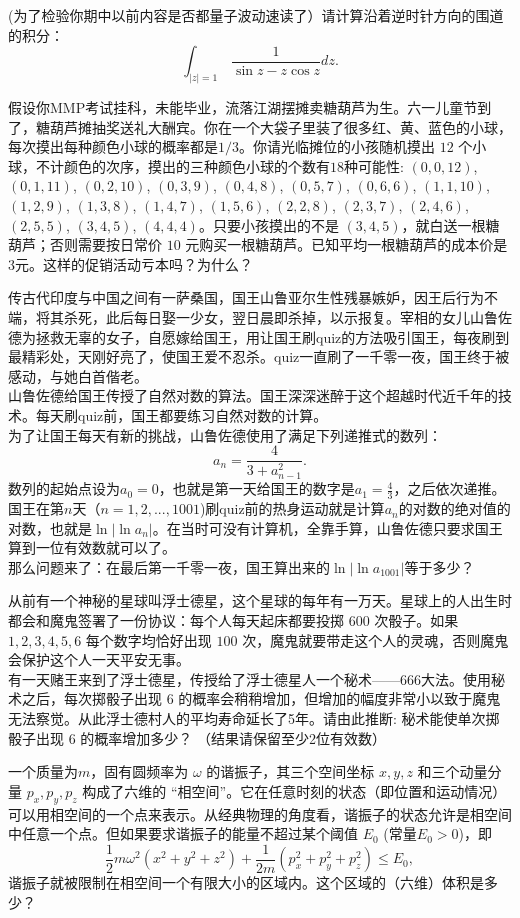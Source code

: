 \item[(1)]{(为了检验你期中以前内容是否都量子波动速读了）请计算沿着逆时针方向的围道的积分：
    $$\int_{|z|=1}\, \frac{1}{\sin z - z\cos z} dz.$$ }
\item[(2)]{假设你MMP考试挂科，未能毕业，流落江湖摆摊卖糖葫芦为生。六一儿童节到了，糖葫芦摊抽奖送礼大酬宾。你在一个大袋子里装了很多红、黄、蓝色的小球，每次摸出每种颜色小球的概率都是$1/3$。你请光临摊位的小孩随机摸出 $12$ 个小球，不计颜色的次序，摸出的三种颜色小球的个数有$18$种可能性: $(0,0,12)$, $(0,1,11)$, $(0,2,10)$, $(0,3,9)$, $(0,4,8)$, $(0, 5, 7)$, $(0, 6, 6)$, $(1, 1, 10)$, $(1,2,9)$, $(1,3,8)$, $(1,4,7)$, $(1, 5, 6)$, $(2, 2, 8)$, $(2, 3, 7)$, $(2, 4, 6)$, $(2, 5, 5)$, $(3, 4, 5)$, $(4,4,4)$。只要小孩摸出的不是 $(3,4,5)$，就白送一根糖葫芦；否则需要按日常价 $10$ 元购买一根糖葫芦。已知平均一根糖葫芦的成本价是 $3$元。这样的促销活动亏本吗？为什么？ }  
\item[(3)]{传古代印度与中国之间有一萨桑国，国王山鲁亚尔生性残暴嫉妒，因王后行为不端，将其杀死，此后每日娶一少女，翌日晨即杀掉，以示报复。宰相的女儿山鲁佐德为拯救无辜的女子，自愿嫁给国王，用让国王刷quiz的方法吸引国王，每夜刷到最精彩处，天刚好亮了，使国王爱不忍杀。quiz一直刷了一千零一夜，国王终于被感动，与她白首偕老。 \\
山鲁佐德给国王传授了自然对数的算法。国王深深迷醉于这个超越时代近千年的技术。每天刷quiz前，国王都要练习自然对数的计算。\\
为了让国王每天有新的挑战，山鲁佐德使用了满足下列递推式的数列：
$$a_n = \frac{4}{3+a_{n-1}^2}.$$
数列的起始点设为$a_0=0$，也就是第一天给国王的数字是$a_1=\frac{4}{3}$，之后依次递推。\\
国王在第$n$天（$n=1,2,...,1001$)刷quiz前的热身运动就是计算$a_n$的对数的绝对值的对数，也就是$\ln|\ln a_n|$。在当时可没有计算机，全靠手算，山鲁佐德只要求国王算到一位有效数就可以了。\\
那么问题来了：在最后第一千零一夜，国王算出来的$\ln|\ln a_{1001}|$等于多少？  }
\item[(4)]{从前有一个神秘的星球叫浮士德星，这个星球的每年有一万天。星球上的人出生时都会和魔鬼签署了一份协议：每个人每天起床都要投掷 $600$ 次骰子。如果 $1,2,3,4,5,6$ 每个数字均恰好出现 $100$ 次，魔鬼就要带走这个人的灵魂，否则魔鬼会保护这个人一天平安无事。\\
    有一天赌王来到了浮士德星，传授给了浮士德星人一个秘术——666大法。使用秘术之后，每次掷骰子出现 $6$ 的概率会稍稍增加，但增加的幅度非常小以致于魔鬼无法察觉。从此浮士德村人的平均寿命延长了5年。请由此推断: 秘术能使单次掷骰子出现 $6$ 的概率增加多少？ （结果请保留至少2位有效数） }
\item[(5)]{一个质量为$m$，固有圆频率为 $\omega$ 的谐振子，其三个空间坐标 $x,y,z$ 和三个动量分量 $p_x, p_y, p_z$ 构成了六维的 ``相空间''。它在任意时刻的状态（即位置和运动情况）可以用相空间的一个点来表示。从经典物理的角度看，谐振子的状态允许是相空间中任意一个点。但如果要求谐振子的能量不超过某个阈值 $E_0$ (常量$E_0>0$)，即
    $$\frac{1}{2}m\omega^2 \left(x^2+y^2+z^2\right) + \frac{1}{2m}\left(p_x^2+p_y^2+p_z^2\right) \le E_0,$$      
    谐振子就被限制在相空间一个有限大小的区域内。这个区域的（六维）体积是多少？}
